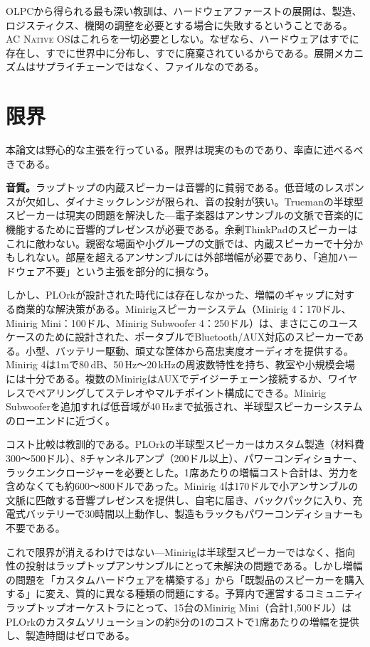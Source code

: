 \documentclass[10pt,letterpaper,twocolumn]{article}
\newcommand{\acos}{\textsc{AC Native OS}}
\begin{document}
OLPCから得られる最も深い教訓は、ハードウェアファーストの展開は、製造、ロジスティクス、機関の調整を必要とする場合に失敗するということである。\acos{}はこれらを一切必要としない。なぜなら、ハードウェアはすでに存在し、すでに世界中に分布し、すでに廃棄されているからである。展開メカニズムはサプライチェーンではなく、ファイルなのである。


\section{限界}
\label{sec:limitations}

本論文は野心的な主張を行っている。限界は現実のものであり、率直に述べるべきである。

\textbf{音質。}ラップトップの内蔵スピーカーは音響的に貧弱である。低音域のレスポンスが欠如し、ダイナミックレンジが限られ、音の投射が狭い。Truemanの半球型スピーカーは現実の問題を解決した---電子楽器はアンサンブルの文脈で音楽的に機能するために音響的プレゼンスが必要である。余剰ThinkPadのスピーカーはこれに敵わない。親密な場面や小グループの文脈では、内蔵スピーカーで十分かもしれない。部屋を超えるアンサンブルには外部増幅が必要であり、「追加ハードウェア不要」という主張を部分的に損なう。

しかし、PLOrkが設計された時代には存在しなかった、増幅のギャップに対する商業的な解決策がある。Minirigスピーカーシステム（Minirig 4：170ドル、Minirig Mini：100ドル、Minirig Subwoofer 4：250ドル）は、まさにこのユースケースのために設計された、ポータブルでBluetooth/AUX対応のスピーカーである。小型、バッテリー駆動、頑丈な筐体から高忠実度オーディオを提供する。Minirig 4は1mで80\,dB、50\,Hz〜20\,kHzの周波数特性を持ち、教室や小規模会場には十分である。複数のMinirigはAUXでデイジーチェーン接続するか、ワイヤレスでペアリングしてステレオやマルチポイント構成にできる。Minirig Subwooferを追加すれば低音域が40\,Hzまで拡張され、半球型スピーカーシステムのローエンドに近づく。

コスト比較は教訓的である。PLOrkの半球型スピーカーはカスタム製造（材料費300〜500ドル）、8チャンネルアンプ（200ドル以上）、パワーコンディショナー、ラックエンクロージャーを必要とした。1席あたりの増幅コスト合計は、労力を含めなくても約600〜800ドルであった。Minirig 4は170ドルで小アンサンブルの文脈に匹敵する音響プレゼンスを提供し、自宅に届き、バックパックに入り、充電式バッテリーで30時間以上動作し、製造もラックもパワーコンディショナーも不要である。

これで限界が消えるわけではない---Minirigは半球型スピーカーではなく、指向性の投射はラップトップアンサンブルにとって未解決の問題である。しかし増幅の問題を「カスタムハードウェアを構築する」から「既製品のスピーカーを購入する」に変え、質的に異なる種類の問題にする。予算内で運営するコミュニティラップトップオーケストラにとって、15台のMinirig Mini（合計1,500ドル）はPLOrkのカスタムソリューションの約8分の1のコストで1席あたりの増幅を提供し、製造時間はゼロである。
\end{document}
